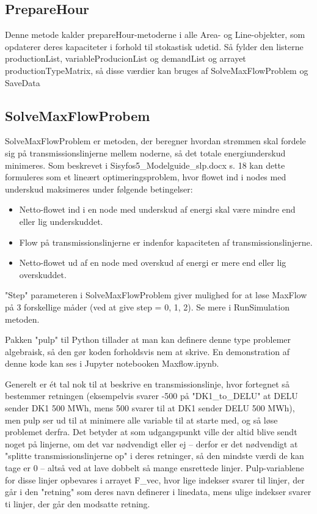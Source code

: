 \documentclass{article}
\begin{document}
\subsection{PrepareHour}
Denne metode kalder prepareHour-metoderne i alle Area- og Line-objekter, som opdaterer deres kapaciteter i forhold til stokastisk udetid. Så fylder den listerne productionList, variableProducionList og demandList og arrayet productionTypeMatrix, så disse værdier kan bruges af SolveMaxFlowProblem og SaveData

\subsection{SolveMaxFlowProbem}
SolveMaxFlowProblem er metoden, der beregner hvordan strømmen skal fordele sig på transmissionslinjerne mellem noderne, så det totale energiunderskud minimeres. Som beskrevet i Sisyfos5\_Modelguide\_slp.docx s. 18 kan dette formuleres som et lineært optimeringsproblem, hvor flowet ind i nodes med underskud maksimeres under følgende betingelser:
\begin{itemize}
    \item Netto-flowet ind i en node med underskud af energi skal være mindre end eller lig underskuddet.
    \item Flow på transmissionslinjerne er indenfor kapaciteten af transmissionslinjerne.
    \item Netto-flowet ud af en node med overskud af energi er mere end eller lig overskuddet. 
\end{itemize}
"Step" parameteren i SolveMaxFlowProblem giver mulighed for at løse MaxFlow på 3 forskellige måder (ved at give step = 0, 1, 2). Se mere i RunSimulation metoden. 

Pakken "pulp" til Python tillader at man kan definere denne type problemer algebraisk, så den gør koden forholdsvis nem at skrive. En demonstration af denne kode kan ses i Jupyter notebooken Maxflow.ipynb. 

Generelt er ét tal nok til at beskrive en transmissionslinje, hvor fortegnet så bestemmer retningen (eksempelvis svarer -500 på "DK1\_to\_DELU" at DELU sender DK1 500 MWh, mens 500 svarer til at DK1 sender DELU 500 MWh), men pulp ser ud til at minimere alle variable til at starte med, og så løse problemet derfra. Det betyder at som udgangspunkt ville der altid blive sendt noget på linjerne, om det var nødvendigt eller ej -- derfor er det nødvendigt at "splitte transmissionslinjerne op" i deres retninger, så den mindste værdi de kan tage er 0 -- altså ved at lave dobbelt så mange ensrettede linjer. Pulp-variablene for disse linjer opbevares i arrayet F\_vec, hvor lige indekser svarer til linjer, der går i den "retning" som deres navn definerer i linedata, mens ulige indekser svarer ti linjer, der går den modsatte retning. 
\end{document}
